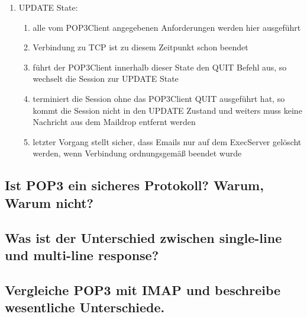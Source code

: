 \documentclass[11pt]{article}
\begin{document}
\begin{enumerate}
        \item UPDATE State:
        \begin{enumerate}
            \item alle vom POP3Client angegebenen Anforderungen werden hier ausgeführt
            \item Verbindung zu TCP ist zu diesem Zeitpunkt schon beendet
            \item führt der POP3Client innerhalb dieser State den QUIT Befehl aus, so
            wechselt die Session zur UPDATE State
            \item terminiert die Session ohne das POP3Client QUIT ausgeführt hat, so kommt
            die Session nicht in den UPDATE Zustand und weiters muss keine Nachricht
            aus dem Maildrop entfernt werden
            \item letzter Vorgang stellt sicher, dass Emails nur auf dem ExecServer gelöscht werden,
            wenn Verbindung ordnungsgemäß beendet wurde
        \end{enumerate}
    \end{enumerate}
    \subsection{Ist POP3 ein sicheres Protokoll? Warum, Warum nicht?}

    \subsection{Was ist der Unterschied zwischen single-line und multi-line response?}

    \subsection{Vergleiche POP3 mit IMAP und beschreibe wesentliche Unterschiede.}
\end{document}
